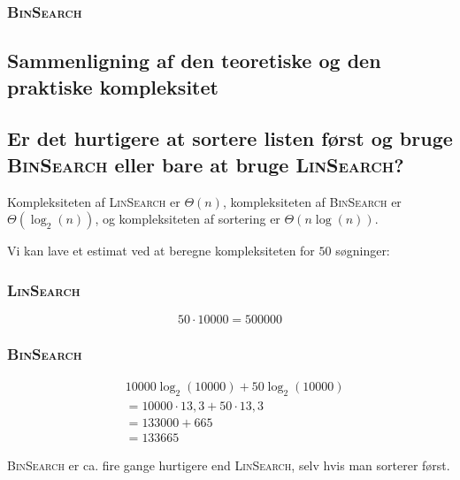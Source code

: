 \subsubsection{\textsc{BinSearch}}

\subsection{Sammenligning af den teoretiske og den praktiske kompleksitet}
\label{subsec:sammenligning-af-den-teoretiske-og-den-praktiske-kompleksitet}

\subsection{Er det hurtigere at sortere listen først og bruge \textsc{BinSearch} eller bare at bruge
\textsc{LinSearch}?}
\label{subsec:er-det-hurtigere-at-sortere-listen-frst-og-bruge-binsearch-eller-bare-at-bruge-linsearch}

Kompleksiteten af \textsc{LinSearch} er \(\Theta(n)\), kompleksiteten af \textsc{BinSearch} er\(\Theta(\log_{2}(n))\),
og kompleksiteten af sortering er \(\Theta(n\log(n))\).

Vi kan lave et estimat ved at beregne kompleksiteten for \(50\) søgninger:

\subsubsection{\textsc{LinSearch}}

\begin{equation}
    50 \cdot 10000 = 500000
    \label{eq:equation16}
\end{equation}

\subsubsection{\textsc{BinSearch}}

\begin{equation}
    \begin{aligned}
        & 10000 \log_{2}(10000) + 50 \log_{2}(10000) \\
        & = 10000 \cdot 13,3 + 50 \cdot 13,3 \\
        & = 133000 + 665 \\
        & = 133665
    \end{aligned}
    \label{eq:equation17}
\end{equation}

\textsc{BinSearch} er ca. fire gange hurtigere end \textsc{LinSearch}, selv hvis man sorterer først.

